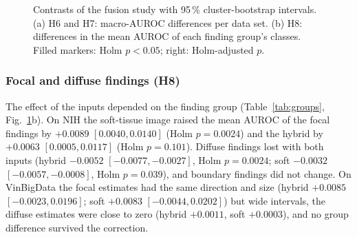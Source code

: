 \begin{table}[!t]
\centering
\caption{Fusion study. Top: test macro-AUROC and macro-AUPRC of the seed ensembles (five seeds; BDCXR-3257: out-of-fold over five folds);
Original: radiograph; Soft: soft-tissue image; Early: three images as channels; Hybrid: three streams; Control: radiograph in three
streams. Bottom: H6 (primary) and H7, differences of the seed ensembles with 95\,\% cluster-bootstrap intervals (\num{10000} resamples);
Holm over the three data sets (H6) and over the six tests of H7.}
\label{tab:fusion}
\end{table}

\begin{figure}[!t]
\centering
{}
\caption{Contrasts of the fusion study with 95\,\% cluster-bootstrap intervals. (a) H6 and H7: macro-AUROC differences per data set.
(b) H8: differences in the mean AUROC of each finding group's classes. Filled markers: Holm $p<0.05$; right: Holm-adjusted $p$.}
\label{fig:cls_forest}
\end{figure}

\subsubsection{Focal and diffuse findings (H8)}
The effect of the inputs depended on the finding group (Table~\ref{tab:groups}, Fig.~\ref{fig:cls_forest}b). On NIH the soft-tissue image
raised the mean AUROC of the focal findings by $+0.0089$ $[0.0040,0.0140]$ (Holm $p=0.0024$) and the hybrid by $+0.0063$ $[0.0005,0.0117]$
(Holm $p=0.101$). Diffuse findings lost with both inputs (hybrid $-0.0052$ $[-0.0077,-0.0027]$, Holm $p=0.0024$; soft $-0.0032$
$[-0.0057,-0.0008]$, Holm $p=0.039$), and boundary findings did not change. On VinBigData the focal estimates had the same direction and
size (hybrid $+0.0085$ $[-0.0023,0.0196]$; soft $+0.0083$ $[-0.0044,0.0202]$) but wide intervals, the diffuse estimates were close to zero
(hybrid $+0.0011$, soft $+0.0003$), and no group difference survived the correction.

\begin{table}[!t]
\centering
\caption{H8: difference in the mean per-class AUROC of each finding group, with 95\,\% cluster-bootstrap intervals; Holm within data set
over groups and contrasts.}
\label{tab:groups}
\end{table}

